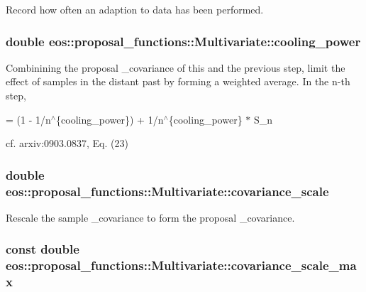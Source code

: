 Record how often an adaption to data has been performed. \hypertarget{classeos_1_1proposal__functions_1_1Multivariate_aabab67ba765f532effe6dd8236d69cdd}{
\subsubsection[{cooling\_\-power}]{\setlength{\rightskip}{0pt plus 5cm}double {\bf eos::proposal\_\-functions::Multivariate::cooling\_\-power}}}
\label{classeos_1_1proposal__functions_1_1Multivariate_aabab67ba765f532effe6dd8236d69cdd}
Combinining the proposal \_\-covariance of this and the previous step, limit the effect of samples in the distant past by forming a weighted average. In the n-\/th step,

= (1 -\/ 1/n$^\wedge$\{cooling\_\-power\})  + 1/n$^\wedge$\{cooling\_\-power\} $\ast$ S\_\-n

cf. arxiv:0903.0837, Eq. (23) \hypertarget{classeos_1_1proposal__functions_1_1Multivariate_ab52678a7403bae09d3db8f2247c02e17}{
\subsubsection[{covariance\_\-scale}]{\setlength{\rightskip}{0pt plus 5cm}double {\bf eos::proposal\_\-functions::Multivariate::covariance\_\-scale}}}
\label{classeos_1_1proposal__functions_1_1Multivariate_ab52678a7403bae09d3db8f2247c02e17}


Rescale the sample \_\-covariance to form the proposal \_\-covariance. \hypertarget{classeos_1_1proposal__functions_1_1Multivariate_ab974d2da4b3dfcb7278418a25b07dd51}{
\subsubsection[{covariance\_\-scale\_\-max}]{\setlength{\rightskip}{0pt plus 5cm}const double {\bf eos::proposal\_\-functions::Multivariate::covariance\_\-scale\_\-max}}}
\label{classeos_1_1proposal__functions_1_1Multivariate_ab974d2da4b3dfcb7278418a25b07dd51}


